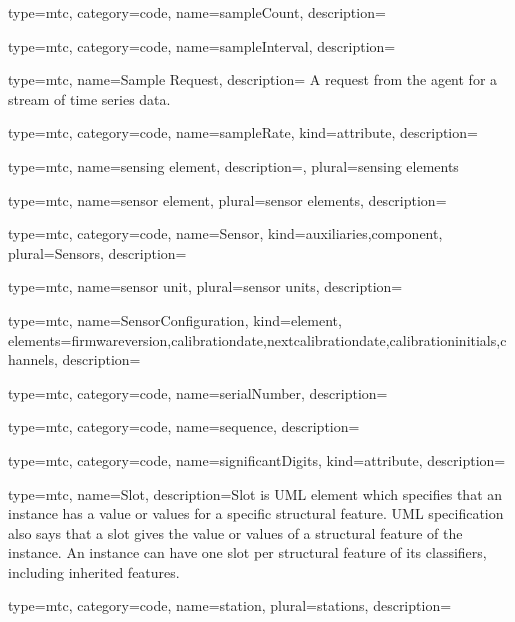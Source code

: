 {
  type=mtc,
  category=code,
  name={sampleCount},
  description={}
}


{
  type=mtc,
  category=code,
  name={sampleInterval},
  description={}
}


{
  type=mtc,
  name={Sample Request},
  description= {A request from the \gls{agent} for a stream of time series data.}
}


{
  type=mtc,
  category=code,
  name={sampleRate},
  kind={attribute},
  description={}
}


{
  type=mtc,
  name={sensing element},
  description={},
  plural={sensing elements}
}


{
  type=mtc,
  name={sensor element},
  plural={sensor elements},
  description={}
}


{
  type=mtc,
  category=code,
  name={Sensor},
  kind={auxiliaries,component},
  plural={Sensors},
  description= {}
}


{
  type=mtc,
  name={sensor unit},
  plural={sensor units},
  description= {}
}


{
  type=mtc,
  name={SensorConfiguration},
  kind={element},
  elements={\gls{firmwareversion},\gls{calibrationdate},\gls{nextcalibrationdate},\gls{calibrationinitials},\glspl{channel}},
  description= {}
}


{
  type=mtc,
  category=code,
  name={serialNumber},
  description={}
}


{
  type=mtc,
  category=code,
  name={sequence},
  description={}
}


{
  type=mtc,
  category=code,
  name={significantDigits},
  kind={attribute},
  description={}
}


{
  type=mtc,
  name=Slot,
  description={Slot is UML element which specifies that an instance has a value or values for a specific structural feature. UML specification also says that a slot gives the value or values of a structural feature of the instance. An instance can have one slot per structural feature of its classifiers, including inherited features.}
}


{
  type=mtc,
  category=code,
  name={station},
  plural={stations},
  description={}
}


